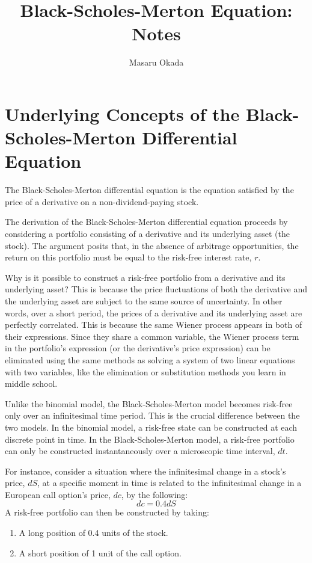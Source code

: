 \documentclass[uplatex]{jsarticle}
\title{Black-Scholes-Merton Equation: Notes}
\author{
Masaru Okada
}
\begin{document}
\maketitle

\maketitle

\section{Underlying Concepts of the Black-Scholes-Merton Differential Equation}

The Black-Scholes-Merton differential equation is the equation satisfied by the price of a derivative on a non-dividend-paying stock.

The derivation of the Black-Scholes-Merton differential equation proceeds by considering a portfolio consisting of a derivative and its underlying asset (the stock). The argument posits that, in the absence of arbitrage opportunities, the return on this portfolio must be equal to the risk-free interest rate, $r$.

Why is it possible to construct a risk-free portfolio from a derivative and its underlying asset? This is because the price fluctuations of both the derivative and the underlying asset are subject to the same source of uncertainty. In other words, over a short period, the prices of a derivative and its underlying asset are perfectly correlated. This is because the same Wiener process appears in both of their expressions. Since they share a common variable, the Wiener process term in the portfolio's expression (or the derivative's price expression) can be eliminated using the same methods as solving a system of two linear equations with two variables, like the elimination or substitution methods you learn in middle school.

Unlike the binomial model, the Black-Scholes-Merton model becomes risk-free only over an infinitesimal time period. This is the crucial difference between the two models. In the binomial model, a risk-free state can be constructed at each discrete point in time. In the Black-Scholes-Merton model, a risk-free portfolio can only be constructed instantaneously over a microscopic time interval, $dt$.

\bigskip

For instance, consider a situation where the infinitesimal change in a stock's price, $dS$, at a specific moment in time is related to the infinitesimal change in a European call option's price, $dc$, by the following:
$$
	dc = 0.4 dS
$$
A risk-free portfolio can then be constructed by taking:
\begin{enumerate}
	\item A long position of 0.4 units of the stock.
	\item A short position of 1 unit of the call option.
\end{enumerate}
\end{document}
